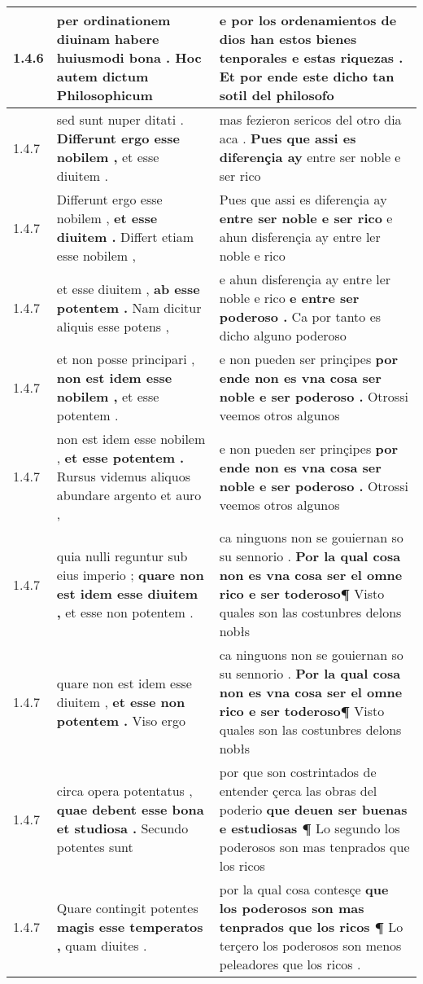 \begin{tabular}{|p{1cm}|p{6.5cm}|p{6.5cm}|}
1.4.6 & per ordinationem diuinam \textbf{ habere huiusmodi bona . } Hoc autem dictum Philosophicum & e por los ordenamientos de dios \textbf{ han estos bienes tenporales e estas riquezas . } Et por ende este dicho tan sotil del philosofo \\\hline
1.4.7 & sed sunt nuper ditati . \textbf{ Differunt ergo esse nobilem , } et esse diuitem . & mas fezieron sericos del otro dia aca . \textbf{ Pues que assi es diferençia ay } entre ser noble e ser rico \\\hline
1.4.7 & Differunt ergo esse nobilem , \textbf{ et esse diuitem . } Differt etiam esse nobilem , & Pues que assi es diferençia ay \textbf{ entre ser noble e ser rico } e ahun disferençia ay entre ler noble e rico \\\hline
1.4.7 & et esse diuitem , \textbf{ ab esse potentem . } Nam dicitur aliquis esse potens , & e ahun disferençia ay entre ler noble e rico \textbf{ e entre ser poderoso . } Ca por tanto es dicho alguno poderoso \\\hline
1.4.7 & et non posse principari , \textbf{ non est idem esse nobilem , } et esse potentem . & e non pueden ser prinçipes \textbf{ por ende non es vna cosa ser noble e ser poderoso . } Otrossi veemos otros algunos \\\hline
1.4.7 & non est idem esse nobilem , \textbf{ et esse potentem . } Rursus videmus aliquos abundare argento et auro , & e non pueden ser prinçipes \textbf{ por ende non es vna cosa ser noble e ser poderoso . } Otrossi veemos otros algunos \\\hline
1.4.7 & quia nulli reguntur sub eius imperio ; \textbf{ quare non est idem esse diuitem , } et esse non potentem . & ca ninguons non se gouiernan so su sennorio . \textbf{ Por la qual cosa non es vna cosa ser el omne rico e ser toderoso¶ } Visto quales son las costunbres delons nobłs \\\hline
1.4.7 & quare non est idem esse diuitem , \textbf{ et esse non potentem . } Viso ergo & ca ninguons non se gouiernan so su sennorio . \textbf{ Por la qual cosa non es vna cosa ser el omne rico e ser toderoso¶ } Visto quales son las costunbres delons nobłs \\\hline
1.4.7 & circa opera potentatus , \textbf{ quae debent esse bona et studiosa . } Secundo potentes sunt & por que son costrintados de entender çerca las obras del poderio \textbf{ que deuen ser buenas e estudiosas ¶ } Lo segundo los poderosos son mas tenprados que los ricos \\\hline
1.4.7 & Quare contingit potentes \textbf{ magis esse temperatos , } quam diuites . & por la qual cosa contesçe \textbf{ que los poderosos son mas tenprados que los ricos ¶ } Lo terçero los poderosos son menos peleadores que los ricos . \\\hline

\end{tabular}
